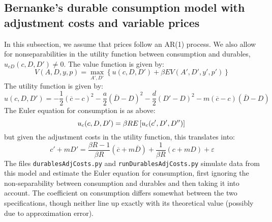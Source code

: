 \subsection{Bernanke's durable consumption model with adjustment costs and variable prices}

In this subsection, we assume that prices follow an AR(1) process. We also allow for nonseparabilities in the utility function between consumption and durables, \(u_{cD}(c, D, D') \neq 0\). The value function is given by:
%
\begin{equation}
	V(A, D, y, p) = \max_{A', D'} \left\{ u(c, D, D') + \beta EV(A', D', y', p') \right\}
\end{equation}
%
The utility function is given by:
%
\begin{equation}
 u(c, D, D') = -\frac{1}{2}(\overline{c} - c)^2 - \frac{a}{2}(\overline{D} - D)^2  - \frac{d}{2}(D' - D)^2 - m(\overline{c} - c)(\overline{D} - D) \label{eqn:utilnonsep}
\end{equation}
%
The Euler equation for consumption is as above:
%
\begin{equation}
 u_c(c, D, D') = \beta R E \left[u_c(c', D', D'')\right] \\
\end{equation}
%
but given the adjustment costs in the utility function, this translates into:
%
\begin{equation}
	c' + mD' = \frac{\beta R - 1}{\beta R}(\overline{c} + m\overline{D}) + \frac{1}{\beta R}(c + mD) + \varepsilon
\end{equation}
%
The files \texttt{durablesAdjCosts.py} and \texttt{runDurablesAdjCosts.py} simulate data from this model and estimate the Euler equation for consumption, first ignoring the non-separability between consumption and durables and then taking it into account. The coefficient on consumption differs somewhat between the two specifications, though neither line up exactly with its theoretical value (possibly due to approximation error).


